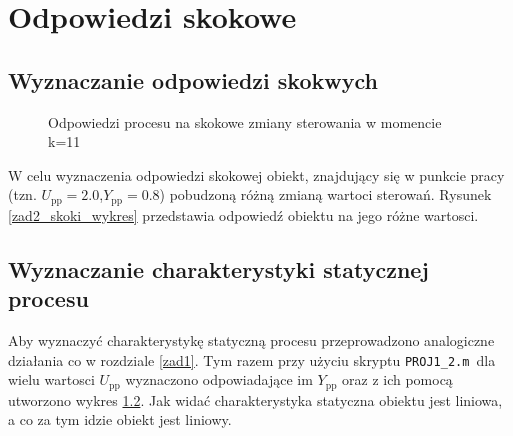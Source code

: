 \chapter{Odpowiedzi skokowe}
\label{zad2}

\section{Wyznaczanie odpowiedzi skokwych}
\label{zad2_skoki}

\begin{figure}[t]
\label{zad2_skoki_wykres}
    \centering
    \caption{Odpowiedzi procesu na skokowe zmiany sterowania w momencie k=11}
    \label{zad2_porow_odp_skok}
\end{figure}

W celu wyznaczenia odpowiedzi skokowej obiekt, znajdujący się w punkcie pracy (tzn. $U_{\mathrm{pp}}= \num{2.0}$,$Y_{\mathrm{pp}}= \num{0.8}$) pobudzoną różną zmianą wartoci sterowań. Rysunek \ref{zad2_skoki_wykres} przedstawia odpowiedź obiektu na jego różne wartosci.

\section{Wyznaczanie charakterystyki statycznej procesu}
\label{zad2_char_stat}
Aby wyznaczyć charakterystykę statyczną procesu przeprowadzono analogiczne działania co w rozdziale \ref{zad1}. Tym razem przy użyciu skryptu \verb+PROJ1_2.m +dla wielu wartosci $U_{\mathrm{pp}}$ wyznaczono odpowiadające im $Y_{\mathrm{pp}}$ oraz z ich pomocą utworzono wykres \ref{zad2_char_stat}. Jak widać charakterystyka statyczna obiektu jest liniowa, a co za tym idzie obiekt jest liniowy.

